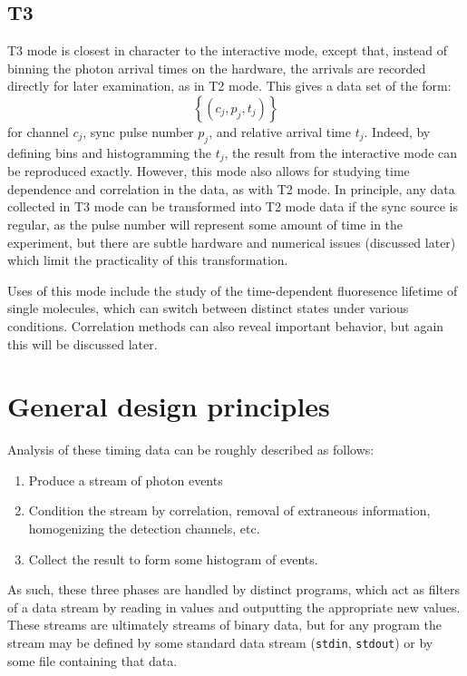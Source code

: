 \documentclass{book}
\newcommand{\braces}[1]{\ensuremath{\left\lbrace #1 \right\rbrace}}
\newcommand{\stdin}{\texttt{stdin}}
\newcommand{\stdout}{\texttt{stdout}}
\begin{document}
\subsection{T3}
T3 mode is closest in character to the interactive mode, except that, instead of binning the photon arrival times on the hardware, the arrivals are recorded directly for later examination, as in T2 mode. This gives a data set of the form:
\begin{equation}
\braces{(c_{j}, p_{j}, t_{j})}
\end{equation}
for channel $c_{j}$, sync pulse number $p_{j}$, and relative arrival time $t_{j}$. Indeed, by defining bins and histogramming the $t_{j}$, the result from the interactive mode can be reproduced exactly. However, this mode also allows for studying time dependence and correlation in the data, as with T2 mode. In principle, any data collected in T3 mode can be transformed into T2 mode data if the sync source is regular, as the pulse number will represent some amount of time in the experiment, but there are subtle hardware and numerical issues (discussed later) which limit the practicality of this transformation.

Uses of this mode include the study of the time-dependent fluoresence lifetime of single molecules, which can switch between distinct states under various conditions. Correlation methods can also reveal important behavior, but again this will be discussed later.

\section{General design principles}
Analysis of these timing data can be roughly described as follows:
\begin{enumerate}
\item Produce a stream of photon events
\item Condition the stream by correlation, removal of extraneous information, homogenizing the detection channels, etc.
\item Collect the result to form some histogram of events.
\end{enumerate}
As such, these three phases are handled by distinct programs, which act as filters of a data stream by reading in values and outputting the appropriate new values. These streams are ultimately streams of binary data, but for any program the stream may be defined by some standard data stream (\stdin, \stdout) or by some file containing that data. 
\end{document}
